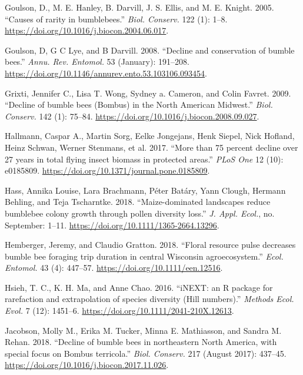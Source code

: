 \documentclass[11pt,]{article}
\begin{document}
\leavevmode\hypertarget{ref-Goulson2005b}{}%
Goulson, D., M. E. Hanley, B. Darvill, J. S. Ellis, and M. E. Knight.
2005. ``Causes of rarity in bumblebees.'' \emph{Biol. Conserv.} 122 (1):
1--8. \url{https://doi.org/10.1016/j.biocon.2004.06.017}.

\leavevmode\hypertarget{ref-Goulson2008c}{}%
Goulson, D, G C Lye, and B Darvill. 2008. ``Decline and conservation of
bumble bees.'' \emph{Annu. Rev. Entomol.} 53 (January): 191--208.
\url{https://doi.org/10.1146/annurev.ento.53.103106.093454}.

\leavevmode\hypertarget{ref-Grixti2009}{}%
Grixti, Jennifer C., Lisa T. Wong, Sydney a. Cameron, and Colin Favret.
2009. ``Decline of bumble bees (Bombus) in the North American Midwest.''
\emph{Biol. Conserv.} 142 (1): 75--84.
\url{https://doi.org/10.1016/j.biocon.2008.09.027}.

\leavevmode\hypertarget{ref-Hallmann2017}{}%
Hallmann, Caspar A., Martin Sorg, Eelke Jongejans, Henk Siepel, Nick
Hofland, Heinz Schwan, Werner Stenmans, et al. 2017. ``More than 75
percent decline over 27 years in total flying insect biomass in
protected areas.'' \emph{PLoS One} 12 (10): e0185809.
\url{https://doi.org/10.1371/journal.pone.0185809}.

\leavevmode\hypertarget{ref-Hass2018a}{}%
Hass, Annika Louise, Lara Brachmann, Péter Batáry, Yann Clough, Hermann
Behling, and Teja Tscharntke. 2018. ``Maize-dominated landscapes reduce
bumblebee colony growth through pollen diversity loss.'' \emph{J. Appl.
Ecol.}, no. September: 1--11.
\url{https://doi.org/10.1111/1365-2664.13296}.

\leavevmode\hypertarget{ref-Hemberger2018}{}%
Hemberger, Jeremy, and Claudio Gratton. 2018. ``Floral resource pulse
decreases bumble bee foraging trip duration in central Wisconsin
agroecosystem.'' \emph{Ecol. Entomol.} 43 (4): 447--57.
\url{https://doi.org/10.1111/een.12516}.

\leavevmode\hypertarget{ref-Hsieh2016}{}%
Hsieh, T. C., K. H. Ma, and Anne Chao. 2016. ``iNEXT: an R package for
rarefaction and extrapolation of species diversity (Hill numbers).''
\emph{Methods Ecol. Evol.} 7 (12): 1451--6.
\url{https://doi.org/10.1111/2041-210X.12613}.

\leavevmode\hypertarget{ref-Jacobson2018a}{}%
Jacobson, Molly M., Erika M. Tucker, Minna E. Mathiasson, and Sandra M.
Rehan. 2018. ``Decline of bumble bees in northeastern North America,
with special focus on Bombus terricola.'' \emph{Biol. Conserv.} 217
(August 2017): 437--45.
\url{https://doi.org/10.1016/j.biocon.2017.11.026}.
\end{document}
